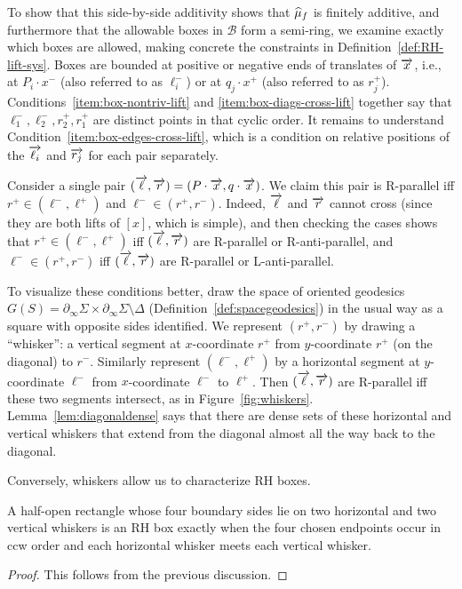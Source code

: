 \begin{figure}
\end{figure}

To show that this side-by-side additivity shows that $\widehat{\mu}_f$ is finitely
additive, and furthermore that the allowable boxes in $\mathcal{B}$ form a semi-ring,
we examine exactly which boxes are allowed, making concrete the
constraints in Definition~\ref{def:RH-lift-sys}. Boxes
are bounded at positive or negative ends of translates of $\overrightarrow{x}$,
i.e., at $P_i \cdot x^-$ (also referred to as $\ell_i^-$) or at
$q_j \cdot x^+$ (also referred to as $r_j^+$).
Conditions~\ref{item:box-nontriv-lift} and \ref{item:box-diags-cross-lift}
together say that $\ell_1^-,\ell_2^-,r_2^+,r_1^+$ are distinct points
in that cyclic order. It remains to understand
Condition~\ref{item:box-edges-cross-lift}, which is a
condition on relative positions of the $\overrightarrow{\ell_i}$ and $\overrightarrow{r_j}$
for each pair separately. 

Consider a single pair
$(\overrightarrow{\ell},\overrightarrow{r}) = (P \cdot \overrightarrow{x}, q \cdot \overrightarrow{x})$. We claim
this pair is R-parallel iff $r^+ \in (\ell^-,\ell^+)$ and
$\ell^- \in (r^+, r^-)$. Indeed, $\overrightarrow{\ell}$ and $\overrightarrow{r}$ cannot
cross (since they are both lifts of $[x]$, which is simple), and then
checking the cases shows that $r^+ \in (\ell^-,\ell^+)$ iff
$(\overrightarrow{\ell},\overrightarrow{r})$ are R-parallel or R-anti-parallel, and
$\ell^- \in (r^+,r^-)$ iff $(\overrightarrow{\ell},\overrightarrow{r})$ are R-parallel or
L-anti-parallel.

To visualize these conditions better, draw the space of oriented
geodesics 
$G(S) = \partial_\infty \Sigma \times \partial_\infty \Sigma \setminus \Delta$ (Definition~\ref{def:spacegeodesics})
in the
usual way as a square with opposite sides identified. We represent
$(r^+,r^-)$ by drawing a ``whisker'': a vertical segment at
$x$-coordinate $r^+$ from $y$-coordinate $r^+$ (on the diagonal) to $r^-$.
Similarly represent $(\ell^-,\ell^+)$ by a
horizontal segment at
$y$-coordinate $\ell^-$ from $x$-coordinate $\ell^-$ to $\ell^+$.
Then $(\overrightarrow{\ell}, \overrightarrow{r})$
are R-parallel iff these two segments intersect, as in
Figure~\ref{fig:whiskers}.
Lemma~\ref{lem:diagonaldense} says that there are dense sets of these
horizontal and vertical whiskers that extend from the diagonal almost
all the way back to the diagonal.

Conversely, whiskers allow us to characterize RH boxes.
\begin{lemma} \label{lem:whiskertobox} A half-open rectangle whose four boundary sides lie on two horizontal and two vertical
whiskers is an RH box exactly when the four chosen endpoints occur in ccw order and each horizontal whisker
meets each vertical whisker.
\end{lemma}
\begin{proof}
  This follows from the previous discussion.
\end{proof}


